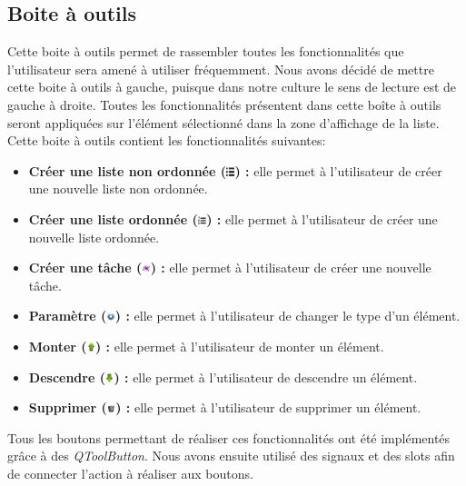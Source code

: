 \documentclass[a4paper,10pt]{article}
\begin{document}
\subsection{Boite à outils}
Cette boite à outils permet de rassembler toutes les fonctionnalités que l'utilisateur sera amené à utiliser fréquemment. Nous avons décidé de mettre cette boite à outils à gauche, puisque dans notre culture le sens de lecture est de gauche à droite. Toutes les fonctionnalités présentent dans cette boîte à outils seront appliquées sur l'élément sélectionné dans la zone d'affichage de la liste. Cette boite à outils contient les fonctionnalités suivantes:
\begin{itemize}
\item \textbf{Créer une liste non ordonnée (\includegraphics[width=0.25cm]{Images/list.png}) :} elle permet à l'utilisateur de créer une nouvelle liste non ordonnée.
\item \textbf{Créer une liste ordonnée (\includegraphics[width=0.25cm]{Images/list_ordered.png}) :} elle permet à l'utilisateur de créer une nouvelle liste ordonnée.
\item \textbf{Créer une tâche (\includegraphics[width=0.25cm]{Images/task.png}) :} elle permet à l'utilisateur de créer une nouvelle tâche.
\item \textbf{Paramètre (\includegraphics[width=0.25cm]{Images/gnome-system.png}) :} elle permet à l'utilisateur de changer le type d'un élément.
\item \textbf{Monter (\includegraphics[width=0.25cm]{Images/arrow_up.png}) :} elle permet à l'utilisateur de monter un élément.
\item \textbf{Descendre  (\includegraphics[width=0.25cm]{Images/arrow_down.png}) :} elle permet à l'utilisateur de descendre un élément.
\item \textbf{Supprimer  (\includegraphics[width=0.25cm]{Images/trash_empty.png}) :}  elle permet à l'utilisateur de supprimer un élément.
\end{itemize}
Tous les boutons permettant de réaliser ces fonctionnalités ont été implémentés grâce à des \textit{QToolButton}. Nous avons ensuite utilisé des signaux et des slots afin de connecter l'action à réaliser aux boutons.
\end{document}
